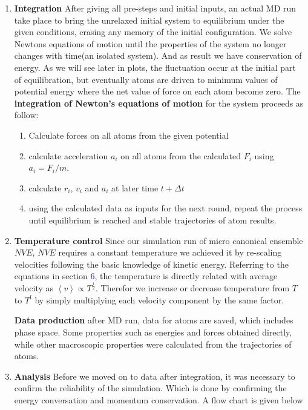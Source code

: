 \documentclass[a4paper]{article}
\begin{document}
\begin{enumerate}
\item \textbf{Integration} After giving all pre-steps and initial inputs, an actual MD run take place to bring the unrelaxed initial system to equilibrium under the given conditions, erasing any memory of the initial configuration. We solve Newtons equations of motion until the properties of the system no longer changes with time(an isolated system). And as result we have conservation of energy. As we will see later in plots, the fluctuation occur at the initial part of equilibration, but eventually atoms are driven to minimum values of potential energy where the net value of force on each atom become zero.
The \textbf {integration of Newton's equations of motion} for the system proceeds as follow:
\begin{enumerate}
\item Calculate forces on all atoms from the given potential
\item calculate acceleration $a_i$ on all atoms from the calculated $F_i$ using $a_i = F_i /m$.
\item calculate $r_i$, $v_i$ and $a_i$ at later time $t + \Delta t$
\item using the calculated data as inputs for the next round, repeat the process until equilibrium is reached and stable trajectories of atom results. 
\end{enumerate}

\item \textbf{Temperature control} Since our simulation run of micro canonical ensemble $NVE$, $NVE$ requires a constant temperature we achieved it by re-scaling velocities following the basic knowledge of kinetic energy. Referring to the equations in section \textcolor{blue}{6},  the temperature is directly related with average velocity as $\left < v \right>  \propto T^{\frac{1}{2}}$. Therefor we increase or decrease temperature from $T$ to $T^{l}$ by simply multiplying each velocity component by the same factor.

\textbf{Data production} after MD run, data for atoms are saved, which includes phase space. Some properties such as energies and forces obtained directly, while other macroscopic properties were calculated from the trajectories of atoms. 

\item \textbf{Analysis} Before we moved on to data after integration, it was necessary to confirm the reliability of the simulation. Which is done by confirming the energy conversation and momentum conservation. A flow chart is given below

\end{enumerate} 
\end{document}

